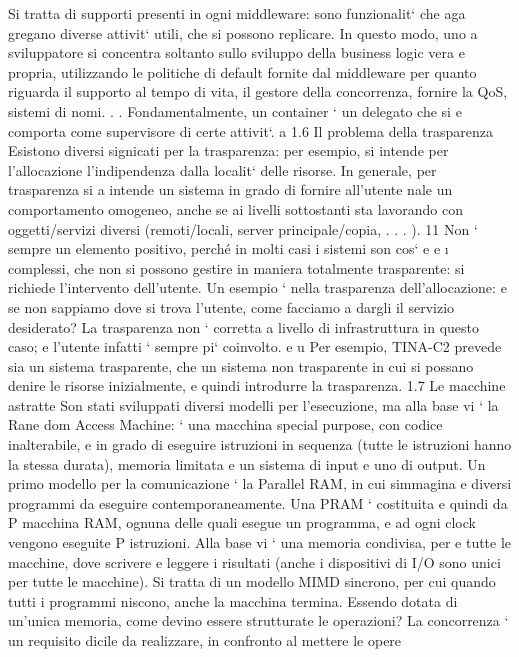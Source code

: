 \documentclass[a4paper,12pt]{article}
\begin{document}
Si tratta di supporti presenti in ogni middleware: sono funzionalit` che aga
gregano diverse attivit` utili, che si possono replicare. In questo modo, uno
a
sviluppatore si concentra soltanto sullo sviluppo della business logic vera e
propria, utilizzando le politiche di default fornite dal middleware per quanto
riguarda il supporto al tempo di vita, il gestore della concorrenza, fornire la
QoS, sistemi di nomi. . . Fondamentalmente, un container ` un delegato che si
e
comporta come supervisore di certe attivit`.
a
1.6
Il problema della trasparenza
Esistono diversi signicati per la trasparenza: per esempio, si intende per l'allocazione l'indipendenza dalla localit`
delle risorse. In generale, per trasparenza si
a
intende un sistema in grado di fornire all'utente nale un comportamento omogeneo, anche se ai livelli sottostanti sta
lavorando con oggetti/servizi diversi
(remoti/locali, server principale/copia, . . . ).
11
\newpage
Non ` sempre un elemento positivo, perché in molti casi i sistemi son cos`
e
e
\i{}
complessi, che non si possono gestire in maniera totalmente trasparente: si
richiede l'intervento dell'utente. Un esempio ` nella trasparenza dell'allocazione:
e
se non sappiamo dove si trova l'utente, come facciamo a dargli il servizio desiderato? La trasparenza non ` corretta a
livello di infrastruttura in questo caso;
e
l'utente infatti ` sempre pi` coinvolto.
e
u
Per esempio, TINA-C2 prevede sia un sistema trasparente, che un sistema
non trasparente in cui si possano denire le risorse inizialmente, e quindi introdurre la trasparenza.
1.7
Le macchine astratte
Son stati sviluppati diversi modelli per l'esecuzione, ma alla base vi ` la Rane
dom Access Machine: ` una macchina special purpose, con codice inalterabile,
e
in grado di eseguire istruzioni in sequenza (tutte le istruzioni hanno la stessa
durata), memoria limitata e un sistema di input e uno di output.
Un primo modello per la comunicazione ` la Parallel RAM, in cui simmagina
e
diversi programmi da eseguire contemporaneamente. Una PRAM ` costituita
e
quindi da P macchina RAM, ognuna delle quali esegue un programma, e ad ogni
clock vengono eseguite P istruzioni. Alla base vi ` una memoria condivisa, per
e
tutte le macchine, dove scrivere e leggere i risultati (anche i dispositivi di I/O
sono unici per tutte le macchine). Si tratta di un modello MIMD sincrono, per
cui quando tutti i programmi niscono, anche la macchina termina. Essendo
dotata di un'unica memoria, come devino essere strutturate le operazioni? La
concorrenza ` un requisito dicile da realizzare, in confronto al mettere le opere
\end{document}
